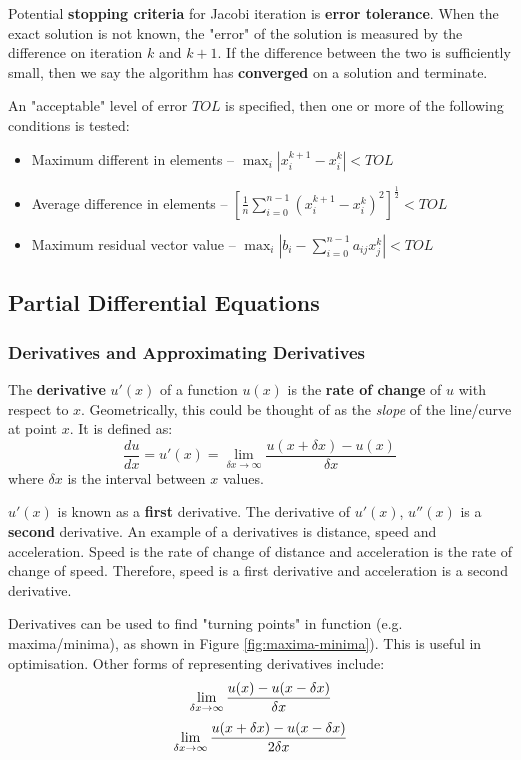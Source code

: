 \documentclass{article}
\begin{document}
Potential \textbf{stopping criteria} for Jacobi iteration is \textbf{error tolerance}. When the exact solution is not known, the "error" of the solution is measured by the difference on iteration $k$ and $k+1$. If the difference between the two is sufficiently small, then we say the algorithm has \textbf{converged} on a solution and terminate.

An "acceptable" level of error $TOL$ is specified, then one or more of the following conditions is tested:
\begin{itemize}
	\item Maximum different in elements -- $\max_{i} |x_i^{k+1} - x_i^k| < TOL$
	\item Average difference in elements -- $[\frac{1}{n} \sum_{i=0}^{n - 1} (x_i^{k + 1} - x_i^k)^2 ]^{\frac{1}{2}} < TOL$
	\item Maximum residual vector value -- $\max_{i} |b_i - \sum_{i=0}^{n - 1} { a_{ij}x_j^k } | < TOL$
\end{itemize}

\subsection{Partial Differential Equations}

\subsubsection{Derivatives and Approximating Derivatives}
The \textbf{derivative} $u'(x)$ of a function $u(x)$ is the \textbf{rate of change} of $u$ with respect to $x$. Geometrically, this could be thought of as the \textit{slope} of the line/curve at point $x$. It is defined as:
\begin{equation}
	\frac{du}{dx} = u'(x) = \lim_{\delta x \rightarrow \infty} \frac{u(x + \delta x) - u(x)}{\delta x}
	\label{eq:derivative1}
\end{equation}
where $\delta x$ is the interval between $x$ values.

$u'(x)$ is known as a \textbf{first} derivative. The derivative of $u'(x)$, $u''(x)$  is a \textbf{second} derivative. An example of a derivatives is distance, speed and acceleration. Speed is the rate of change of distance and acceleration is the rate of change of speed. Therefore, speed is a first derivative and acceleration is a second derivative.

Derivatives can be used to find "turning points" in function (e.g. maxima/minima), as shown in Figure \ref{fig:maxima-minima}). This is useful in optimisation.  Other forms of representing derivatives include:
\begin{equation}\\
	\lim_{\delta x \rightarrow \infty} \frac{u(x) - u(x - \delta x)}{\delta x}
	\label{eq:derivative2}
\end{equation}
\begin{equation}\\
	\lim_{\delta x \rightarrow \infty} \frac{u(x + \delta x) - u(x - \delta x)}{2\delta x} \\
	\label{eq:derivative3}
\end{equation}
\end{document}
